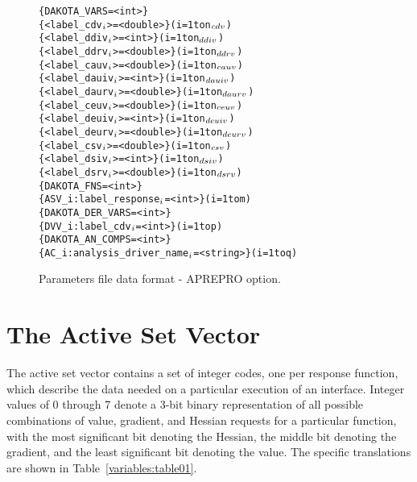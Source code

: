 \begin{figure}
  \begin{bigbox}
  \centering
  \begin{alltt}
    \{ DAKOTA_VARS = <int> \}
    \{ <label_cdv\(\sb{i}\)> = <double> \}         (i = 1 to n\(\sb{cdv}\))
    \{ <label_ddiv\(\sb{i}\)> = <int> \}           (i = 1 to n\(\sb{ddiv}\))
    \{ <label_ddrv\(\sb{i}\)> = <double> \}        (i = 1 to n\(\sb{ddrv}\))
    \{ <label_cauv\(\sb{i}\)> = <double> \}        (i = 1 to n\(\sb{cauv}\))
    \{ <label_dauiv\(\sb{i}\)> = <int> \}          (i = 1 to n\(\sb{dauiv}\))
    \{ <label_daurv\(\sb{i}\)> = <double> \}       (i = 1 to n\(\sb{daurv}\))
    \{ <label_ceuv\(\sb{i}\)> = <double> \}        (i = 1 to n\(\sb{ceuv}\))
    \{ <label_deuiv\(\sb{i}\)> = <int> \}          (i = 1 to n\(\sb{deuiv}\))
    \{ <label_deurv\(\sb{i}\)> = <double> \}       (i = 1 to n\(\sb{deurv}\))
    \{ <label_csv\(\sb{i}\)> = <double> \}         (i = 1 to n\(\sb{csv}\))
    \{ <label_dsiv\(\sb{i}\)> = <int> \}           (i = 1 to n\(\sb{dsiv}\))
    \{ <label_dsrv\(\sb{i}\)> = <double> \}        (i = 1 to n\(\sb{dsrv}\)) \color{blue}
    \{ DAKOTA_FNS = <int> \}
    \{ ASV_i:label_response\(\sb{i}\) = <int> \}              (i = 1 to m) \color{red}
    \{ DAKOTA_DER_VARS = <int> \}
    \{ DVV_i:label_cdv\(\sb{i}\) = <int> \}                   (i = 1 to p) \color{green}
    \{ DAKOTA_AN_COMPS = <int> \}
    \{ AC_i:analysis_driver_name\(\sb{i}\) = <string> \}      (i = 1 to q)
  \end{alltt}
  \end{bigbox}
  \caption{Parameters file data format - APREPRO option.}
  \label{variables:figure02}
\end{figure}

\section{The Active Set Vector}\label{variables:asv}

The active set vector contains a set of integer codes, one per
response function, which describe the data needed on a particular
execution of an interface. Integer values of 0 through 7 denote a
3-bit binary representation of all possible combinations of value,
gradient, and Hessian requests for a particular function, with the
most significant bit denoting the Hessian, the middle bit denoting the
gradient, and the least significant bit denoting the value. The
specific translations are shown in Table~\ref{variables:table01}.

